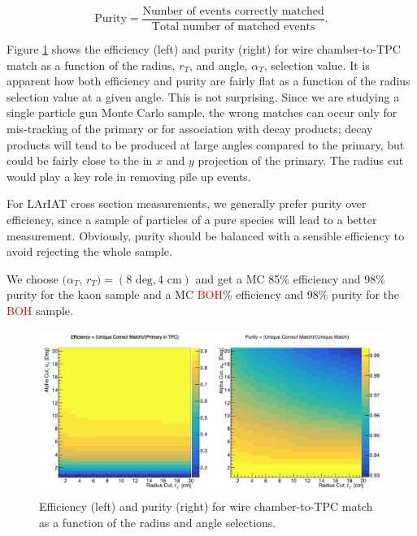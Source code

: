 \begin{equation}
\text{Purity} = \frac{\text{Number of events correctly matched}}{\text{Total number of matched events}}.
\end{equation}

Figure \ref{fig:EffPurityK} shows the efficiency (left) and purity (right) for wire chamber-to-TPC match as a function of the radius, $r_{T}$, and angle, $\alpha_{T}$, selection value. It is apparent how both efficiency and purity are fairly flat as a function of the radius selection value at a given angle. This is not surprising. Since we are studying a single particle gun Monte Carlo sample, the wrong matches can occur only for mis-tracking of the primary or for association with decay products;  decay products will tend to be produced at large angles compared to the primary, but could be fairly close to the in $x$ and $y$ projection of the primary. The radius cut would play a key role in removing pile up events. 

For LArIAT cross section measurements, we generally prefer purity over efficiency, since a sample of particles of a pure species will lead to a better measurement. Obviously, purity should be balanced with a sensible efficiency to avoid rejecting the whole sample. 

We choose $(\alpha_{T}$, $r_{T}) = (8 \text{ deg}, 4 \text{ cm} )$ and get a MC 85\% efficiency and 98\% purity for the kaon sample and a MC \textcolor{red}{BOH}\% efficiency and 98\% purity for the \textcolor{red}{BOH} sample.


\begin{figure}[hpbt]
\centering
\includegraphics[width=15cm]{Chapter-5/Images/KEffPurity.png}
\caption{Efficiency (left) and purity (right) for wire chamber-to-TPC match as a function of the radius and angle selections.}
\label{fig:EffPurityK}
\end{figure}

